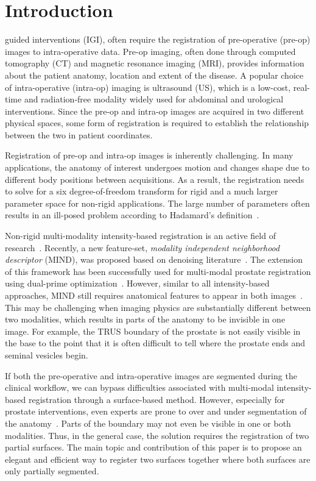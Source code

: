 \documentclass[journal]{IEEEtran}
\begin{document}
\IEEEpeerreviewmaketitle
\section{Introduction}
 guided interventions (IGI), often require the registration of pre-operative (pre-op) images to intra-operative data. Pre-op imaging, often done through computed tomography (CT) and magnetic resonance imaging (MRI), provides information about the patient anatomy, location and extent of the disease. A popular choice of intra-operative (intra-op) imaging is ultrasound (US), which is a low-cost, real-time and radiation-free modality widely used for abdominal and urological interventions. Since the pre-op and intra-op images are acquired in two different physical spaces, some form of registration is required to establish the relationship between the two in patient coordinates.

Registration of pre-op and intra-op images is inherently challenging. In many applications, the anatomy of interest undergoes motion and changes shape due to different body positions between acquisitions. As a result, the registration needs to solve for a six degree-of-freedom transform for rigid and a much larger parameter space for non-rigid applications. The large number of parameters often results in an ill-posed problem according to Hadamard's definition~\cite{Hadamard23}.

Non-rigid multi-modality intensity-based registration is an active field of research~\cite{Pluim03a,Sotiras13a}. Recently, a new feature-set, \textit{modality independent neighborhood descriptor} (MIND), was proposed based on denoising literature~\cite{Heinrich12a}. The extension of this framework has been successfully used for multi-modal prostate registration using dual-prime optimization~\cite{Sun13a}. However, similar to all intensity-based approaches, MIND still requires anatomical features to appear in both images~\cite{Heinrich12a}. This may be challenging when imaging physics are substantially different between two modalities, which results in parts of the anatomy to be invisible in one image. For example, the TRUS boundary of the prostate is not easily visible in the base to the point that it is often difficult to tell where the prostate ends and seminal vesicles begin.

If both the pre-operative and intra-operative images are segmented during the clinical workflow, we can bypass difficulties associated with multi-modal intensity-based registration through a surface-based method. However, especially for prostate interventions, even experts are prone to over and under segmentation of the anatomy~\cite{Smith07a}. Parts of the boundary may not even be visible in one or both modalities. Thus, in the general case, the solution requires the registration of two partial surfaces. The main topic and contribution of this paper is to propose an elegant and efficient way to register two surfaces together where both surfaces are only partially segmented.
\end{document}
